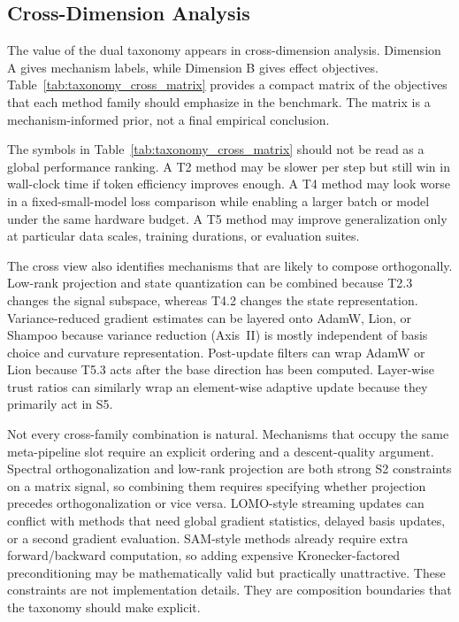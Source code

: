 \subsection{Cross-Dimension Analysis}
\label{sec:taxonomy-cross}

The value of the dual taxonomy appears in cross-dimension analysis.
Dimension A gives mechanism labels, while Dimension B gives effect objectives.
Table~\ref{tab:taxonomy_cross_matrix} provides a compact matrix of the
objectives that each method family should emphasize in the benchmark.  The
matrix is a mechanism-informed prior, not a final empirical conclusion.



The symbols in Table~\ref{tab:taxonomy_cross_matrix} should not be read as a
global performance ranking.  A T2 method may be slower per step but still win
in wall-clock time if token efficiency improves enough.  A T4 method may look
worse in a fixed-small-model loss comparison while enabling a larger batch or
model under the same hardware budget.  A T5 method may improve generalization
only at particular data scales, training durations, or evaluation suites.

The cross view also identifies mechanisms that are likely to compose
orthogonally.  Low-rank projection and state quantization can be combined
because T2.3 changes the signal subspace, whereas T4.2 changes the state
representation.  Variance-reduced gradient estimates can be layered onto
AdamW, Lion, or Shampoo because variance reduction (Axis~II) is mostly independent of basis choice
and curvature representation.  Post-update filters can wrap AdamW or Lion
because T5.3 acts after the base direction has been computed.  Layer-wise
trust ratios can similarly wrap an element-wise adaptive update because they
primarily act in S5.

Not every cross-family combination is natural.  Mechanisms that occupy the
same meta-pipeline slot require an explicit ordering and a descent-quality
argument.  Spectral orthogonalization and low-rank projection are both strong
S2 constraints on a matrix signal, so combining them requires specifying whether
projection precedes orthogonalization or vice versa.  LOMO-style streaming
updates can conflict with methods that need global gradient statistics,
delayed basis updates, or a second gradient evaluation.  SAM-style methods
already require extra forward/backward computation, so adding expensive
Kronecker-factored preconditioning may be mathematically valid but practically
unattractive.  These constraints are not implementation details.  They are
composition boundaries that the taxonomy should make explicit.

